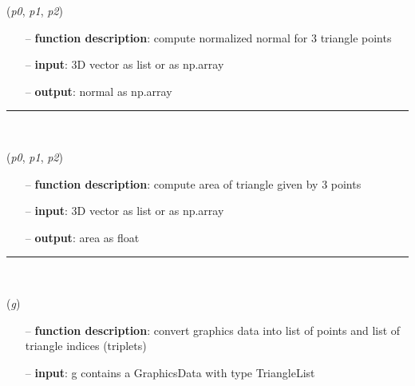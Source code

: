 \begin{itemize}[leftmargin=1.4cm]
\begin{itemize}[leftmargin=1.4cm]
\begin{itemize}[leftmargin=0.5cm]
\begin{itemize}[leftmargin=1.4cm]
\begin{itemize}[leftmargin=1.4cm]
\begin{itemize}[leftmargin=0.5cm]
\begin{itemize}[leftmargin=1.4cm]
\begin{itemize}[leftmargin=0.5cm]
\begin{flushleft}
\label{sec:graphicsDataUtilities:ComputeTriangleNormal}
({\it p0}, {\it p1}, {\it p2})
\end{flushleft}
\setlength{\itemindent}{0.7cm}
\begin{itemize}[leftmargin=0.7cm]
\item[--]{\bf function description}: compute normalized normal for 3 triangle points
\item[--]{\bf input}: 3D vector as list or as np.array
\item[--]{\bf output}: normal as np.array
\vspace{12pt}\end{itemize}
%
\noindent\rule{8cm}{0.75pt}\vspace{1pt} \\ 
\begin{flushleft}
\label{sec:graphicsDataUtilities:ComputeTriangleArea}
({\it p0}, {\it p1}, {\it p2})
\end{flushleft}
\setlength{\itemindent}{0.7cm}
\begin{itemize}[leftmargin=0.7cm]
\item[--]{\bf function description}: compute area of triangle given by 3 points
\item[--]{\bf input}: 3D vector as list or as np.array
\item[--]{\bf output}: area as float
\vspace{12pt}\end{itemize}
%
\noindent\rule{8cm}{0.75pt}\vspace{1pt} \\ 
\begin{flushleft}
\label{sec:graphicsDataUtilities:GraphicsData2PointsAndTrigs}
({\it g})
\end{flushleft}
\setlength{\itemindent}{0.7cm}
\begin{itemize}[leftmargin=0.7cm]
\item[--]{\bf function description}: convert graphics data into list of points and list of triangle indices (triplets)
\item[--]{\bf input}: g contains a GraphicsData with type TriangleList

\end{itemize}
\end{itemize}
\end{itemize}
\end{itemize}
\end{itemize}
\end{itemize}
\end{itemize}
\end{itemize}
\end{itemize}

